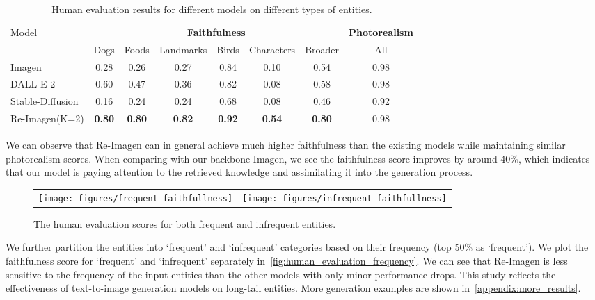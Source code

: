 \documentclass{article} \usepackage{iclr2023_conference,times}
\newcommand{\modelname}{{Re-Imagen}\xspace}
\begin{document}
\begin{table}[!t]
    \small
    \centering
    \begin{tabular}{l|cccccc|c}
        \toprule
        \multirow{2}{*}{Model} & \multicolumn{6}{c|}{\textbf{Faithfulness}} & \textbf{Photorealism} \\
        & Dogs & Foods & Landmarks & Birds & Characters & Broader & All \\
        \midrule \addlinespace
        Imagen           & 0.28   & 0.26  & 0.27  & 0.84   & 0.10  & 0.54  & 0.98 \\
        DALL-E 2         & 0.60   & 0.47  & 0.36  & 0.82   & 0.08  & 0.58  & 0.98 \\
        Stable-Diffusion & 0.16   & 0.24  & 0.24  & 0.68   & 0.08  & 0.46  & 0.92 \\
        \midrule \addlinespace
        \modelname (K=2) & \textbf{0.80}  &  \textbf{0.80} & \textbf{0.82} &  \textbf{0.92} & \textbf{0.54}  &  \textbf{0.80}  & 0.98 \\
        \bottomrule
    \end{tabular}
    \caption{Human evaluation results for different models on different types of entities. }
    \label{tab:faithfulness}
    \vspace{-2ex}
\end{table}
We can observe that \modelname can in general achieve much higher faithfulness than the existing models while maintaining similar photorealism scores. When comparing with our backbone Imagen, we see the faithfulness score improves by around 40\%, which indicates that our model is paying attention to the retrieved knowledge and assimilating it into the generation process. 

\begin{figure}[!h]
    \small
    \centering
    \begin{tabular}{cc}
        \texttt{[image: figures/frequent\_faithfullness]} & 
        \texttt{[image: figures/infrequent\_faithfullness]}
    \end{tabular}
    \vspace{-2ex}
    \caption{The human evaluation scores for both frequent and infrequent entities. }
    \label{fig:human_evaluation_frequency}
    \vspace{-2ex}
\end{figure}
We further partition the entities into `frequent' and `infrequent' categories based on their frequency (top 50\% as `frequent'). We plot the faithfulness score for `frequent' and `infrequent' separately in~\autoref{fig:human_evaluation_frequency}. We can see that \modelname is less sensitive to the frequency of the input entities than the other models with only minor performance drops. This study reflects the effectiveness of text-to-image generation models on long-tail entities.  More generation examples are shown in~\autoref{appendix:more_results}.
\end{document}
